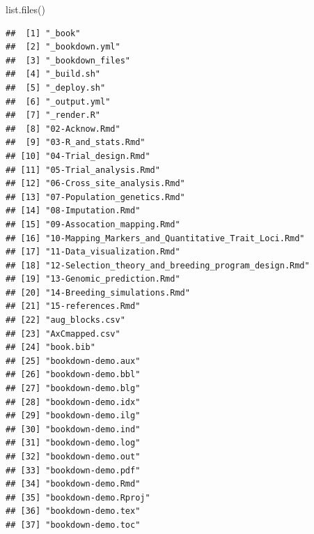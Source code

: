 \documentclass[
]{book}
\newenvironment{Shaded}{\begin{snugshade}}{\end{snugshade}}
\newcommand{\FunctionTok}[1]{\textcolor[rgb]{0.00,0.00,0.00}{#1}}
\newcommand{\NormalTok}[1]{#1}
\begin{document}
\begin{Shaded}
\begin{Highlighting}[]
\FunctionTok{list.files}\NormalTok{()}
\end{Highlighting}
\end{Shaded}

\begin{verbatim}
##  [1] "_book"                                              
##  [2] "_bookdown.yml"                                      
##  [3] "_bookdown_files"                                    
##  [4] "_build.sh"                                          
##  [5] "_deploy.sh"                                         
##  [6] "_output.yml"                                        
##  [7] "_render.R"                                          
##  [8] "02-Acknow.Rmd"                                      
##  [9] "03-R_and_stats.Rmd"                                 
## [10] "04-Trial_design.Rmd"                                
## [11] "05-Trial_analysis.Rmd"                              
## [12] "06-Cross_site_analysis.Rmd"                         
## [13] "07-Population_genetics.Rmd"                         
## [14] "08-Imputation.Rmd"                                  
## [15] "09-Assocation_mapping.Rmd"                          
## [16] "10-Mapping_Markers_and_Quantitative_Trait_Loci.Rmd" 
## [17] "11-Data_visualization.Rmd"                          
## [18] "12-Selection_theory_and_breeding_program_design.Rmd"
## [19] "13-Genomic_prediction.Rmd"                          
## [20] "14-Breeding_simulations.Rmd"                        
## [21] "15-references.Rmd"                                  
## [22] "aug_blocks.csv"                                     
## [23] "AxCmapped.csv"                                      
## [24] "book.bib"                                           
## [25] "bookdown-demo.aux"                                  
## [26] "bookdown-demo.bbl"                                  
## [27] "bookdown-demo.blg"                                  
## [28] "bookdown-demo.idx"                                  
## [29] "bookdown-demo.ilg"                                  
## [30] "bookdown-demo.ind"                                  
## [31] "bookdown-demo.log"                                  
## [32] "bookdown-demo.out"                                  
## [33] "bookdown-demo.pdf"                                  
## [34] "bookdown-demo.Rmd"                                  
## [35] "bookdown-demo.Rproj"                                
## [36] "bookdown-demo.tex"                                  
## [37] "bookdown-demo.toc"                                  

\end{verbatim}
\end{document}
